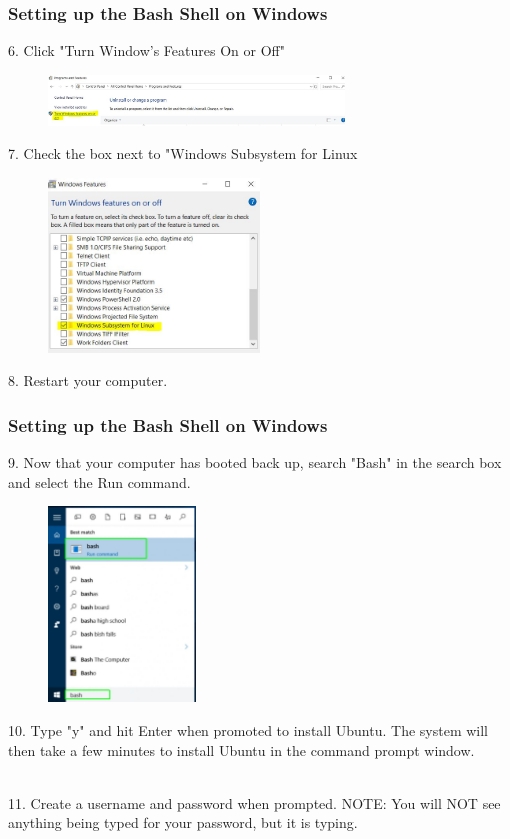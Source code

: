 \documentclass{if-beamer}
\begin{document}
\begin{frame}
\frametitle{Setting up the Bash Shell on Windows}
6. Click "Turn Window's Features On or Off"
\begin{figure}
	\centering
	\includegraphics[width=0.7\textwidth]{figures/step6.jpg}
\end{figure}
7. Check the box next to "Windows Subsystem for Linux
\begin{figure}
	\centering
	\includegraphics[width=0.5\textwidth]{figures/step7.jpg}
\end{figure}
8. Restart your computer.
\end{frame}

\begin{frame}
\frametitle{Setting up the Bash Shell on Windows}

9. Now that your computer has booted back up, search "Bash" in the search box and select the Run command.
\begin{figure}
	\centering
	\includegraphics[width=0.35\textwidth]{figures/step8.jpg}
\end{figure}

10. Type "y" and hit Enter when promoted to install Ubuntu. The system will then take a few minutes to install Ubuntu in the command prompt window. \\~\

11. Create a username and password when prompted. NOTE: You will NOT see anything being typed for your password, but it is typing. 
\end{frame}
\end{document}
